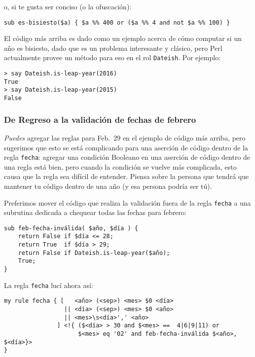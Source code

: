 o, si te gusta ser conciso (o la ofuscación):

\begin{verbatim}
sub es-bisiesto($a) { $a %% 400 or ($a %% 4 and not $a %% 100) }
\end{verbatim}

El código más arriba es dado como un ejemplo acerca de
cómo computar si un año es bisiesto, dado que es un problema
interesante y clásico, pero Perl actualmente provee un método
para eso en el rol {\tt Dateish}. Por ejemplo:

\begin{verbatim}
> say Dateish.is-leap-year(2016)
True
> say Dateish.is-leap-year(2015)
False
\end{verbatim}

\subsubsection{De Regreso a la validación de fechas de febrero}

\emph{Puedes} agregar las reglas para Feb.~29 en el ejemplo 
de código más arriba, pero sugerimos que esto se está
complicando  para una aserción de código dentro de la
regla {\tt fecha}: agregar una condición Booleano en una
aserción de código dentro de una regla está bien, pero
cuando la condición se vuelve más complicada, esto causa
que la regla sea difícil de entender. Piensa sobre la persona
que tendrá que mantener tu código dentro de una año (y esa
persona podría ser tú).

Preferimos mover el código que realiza la validación 
fuera de la regla {\tt fecha} a una subrutina dedicada
a chequear todas las fechas para febrero:

\begin{verbatim}
sub feb-fecha-inválida( $año, $día ) {
    return False if $día <= 28;
    return True  if $día > 29;
    return False if Dateish.is-leap-year($año);
    True;
}
\end{verbatim}

La regla {\tt fecha} lucí ahora así:

\begin{verbatim}
my rule fecha { [   <año> (<sep>) <mes> $0 <día> 
                 || <día> (<sep>) <mes> $0 <año> 
                 || <mes>\s<día>',' <año>
               ] <!{ ($<día> > 30 and $<mes> ==  4|6|9|11) or 
                     $<mes> eq '02' and feb-fecha-inválida $<año>, $<día>}>
} 
\end{verbatim}

